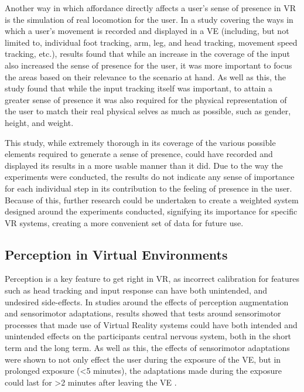 		Another way in which affordance directly affects a user's sense of presence in VR is the simulation of real locomotion for the user.
		In a study \cite{Turchet2015} covering the ways in which a user's movement is recorded and displayed in a VE (including, but not limited to, individual foot tracking, arm, leg, and head tracking, movement speed tracking, etc.), results found that while an increase in the coverage of the input also increased the sense of presence for the user, it was more important to focus the areas based on their relevance to the scenario at hand.
		As well as this, the study found that while the input tracking itself was important, to attain a greater sense of presence it was also required for the physical representation of the user to match their real physical selves as much as possible, such as gender, height, and weight.

		This study, while extremely thorough in its coverage of the various possible elements required to generate a sense of presence, could have recorded and displayed its results in a more usable manner than it did.
		Due to the way the experiments were conducted, the results do not indicate any sense of importance for each individual step in its contribution to the feeling of presence in the user.
		Because of this, further research could be undertaken to create a weighted system designed around the experiments conducted, signifying its importance for specific VR systems, creating a more convenient set of data for future use.

	\subsection{Perception in Virtual Environments}
	\label{lr:vr:perception}
		Perception is a key feature to get right in VR, as incorrect calibration for features such as head tracking and input response can have both unintended, and undesired side-effects. In studies \cite{Wright2006}  \cite{Wright2009} \cite{Wright2011} \cite{Wright2013} \cite{Wright2014} around the effects of perception augmentation and sensorimotor adaptations, results showed that tests around sensorimotor processes that made use of Virtual Reality systems could have both intended and unintended effects on the participants central nervous system, both in the short term and the long term.
		As well as this, the effects of sensorimotor adaptations were shown to not only effect the user during the exposure of the VE, but in prolonged exposure (<5 minutes), the adaptations made during the exposure could last for >2 minutes after leaving the VE \cite{Wright2013}.

